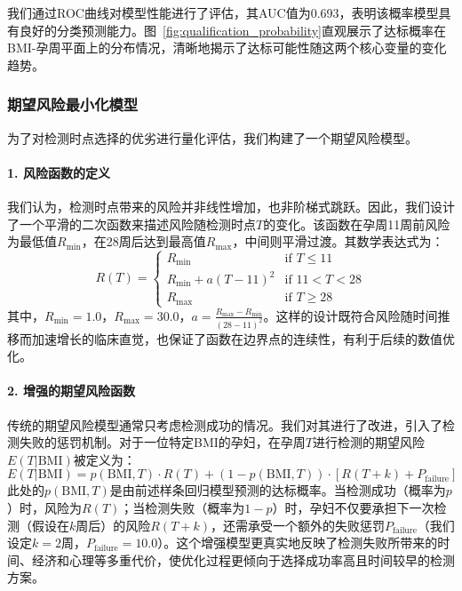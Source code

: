 \documentclass[12pt,a4paper]{ctexart}
\numberwithin{equation}{section}
\theoremstyle{mcm}
\begin{document}
我们通过ROC曲线对模型性能进行了评估，其AUC值为0.693，表明该概率模型具有良好的分类预测能力。图~\ref{fig:qualification_probability}直观展示了达标概率在BMI-孕周平面上的分布情况，清晰地揭示了达标可能性随这两个核心变量的变化趋势。

\subsubsection{期望风险最小化模型}

为了对检测时点选择的优劣进行量化评估，我们构建了一个期望风险模型。

\paragraph{1. 风险函数的定义}
我们认为，检测时点带来的风险并非线性增加，也非阶梯式跳跃。因此，我们设计了一个平滑的二次函数来描述风险随检测时点$T$的变化。该函数在孕周11周前风险为最低值$R_{\min}$，在28周后达到最高值$R_{\max}$，中间则平滑过渡。其数学表达式为：
\begin{equation}
    R(T) = 
    \begin{cases} 
        R_{\min} & \text{if } T \le 11 \\
        R_{\min} + a(T - 11)^2 & \text{if } 11 < T < 28 \\
        R_{\max} & \text{if } T \ge 28 
    \end{cases}
\end{equation}
其中，$R_{\min} = 1.0$，$R_{\max} = 30.0$，$a = \frac{R_{\max} - R_{\min}}{(28-11)^2}$。这样的设计既符合风险随时间推移而加速增长的临床直觉，也保证了函数在边界点的连续性，有利于后续的数值优化。

\paragraph{2. 增强的期望风险函数}
传统的期望风险模型通常只考虑检测成功的情况。我们对其进行了改进，引入了检测失败的惩罚机制。对于一位特定BMI的孕妇，在孕周$T$进行检测的期望风险$E(T | \text{BMI})$被定义为：
\begin{equation}
    E(T | \text{BMI}) = p(\text{BMI}, T) \cdot R(T) + (1 - p(\text{BMI}, T)) \cdot [R(T+k) + P_{\text{failure}}]
\end{equation}
此处的$p(\text{BMI}, T)$是由前述样条回归模型预测的达标概率。当检测成功（概率为$p$）时，风险为$R(T)$；当检测失败（概率为$1-p$）时，孕妇不仅要承担下一次检测（假设在$k$周后）的风险$R(T+k)$，还需承受一个额外的失败惩罚$P_{\text{failure}}$（我们设定$k=2$周，$P_{\text{failure}}=10.0$）。这个增强模型更真实地反映了检测失败所带来的时间、经济和心理等多重代价，使优化过程更倾向于选择成功率高且时间较早的检测方案。
\end{document}

